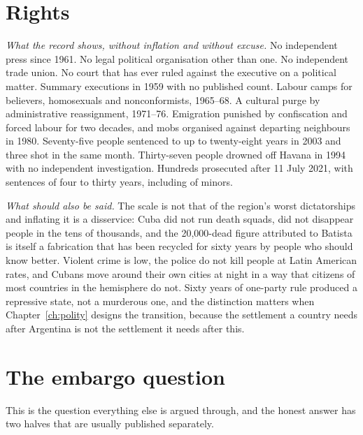 \section{Rights}

\emph{What the record shows, without inflation and without excuse.} No
independent press since 1961. No legal political organisation other than one. No
independent trade union. No court that has ever ruled against the executive on a
political matter. Summary executions in 1959 with no published count. Labour
camps for believers, homosexuals and nonconformists, 1965--68. A cultural purge
by administrative reassignment, 1971--76. Emigration punished by confiscation
and forced labour for two decades, and mobs organised against departing
neighbours in 1980. Seventy-five people sentenced to up to twenty-eight years in
2003 and three shot in the same month. Thirty-seven people drowned off Havana in
1994 with no independent investigation. Hundreds prosecuted after 11 July 2021,
with sentences of four to thirty years, including of minors.

\emph{What should also be said.} The scale is not that of the region's worst
dictatorships and inflating it is a disservice: Cuba did not run death squads,
did not disappear people in the tens of thousands, and the 20,000-dead figure
attributed to Batista is itself a fabrication that has been recycled for sixty
years by people who should know better. Violent crime is low, the police do not
kill people at Latin American rates, and Cubans move around their own cities at
night in a way that citizens of most countries in the hemisphere do not. Sixty
years of one-party rule produced a repressive state, not a murderous one, and
the distinction matters when Chapter~\ref{ch:polity} designs the transition,
because the settlement a country needs after Argentina is not the settlement it
needs after this.

\section{The embargo question}

This is the question everything else is argued through, and the honest answer
has two halves that are usually published separately.

